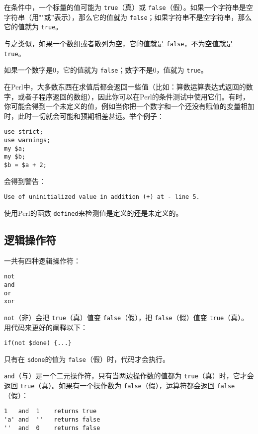 在条件中，一个标量的值可能为 \verb|true|（真）或 \verb|false|（假）。如果一个字符串是空字符串（用""或''表示），那么它的值就为 \verb|false|；如果字符串不是空字符串，那么它的值就为 \verb|true|。

与之类似，如果一个数组或者散列为空，它的值就是 \verb|false|，不为空值就是 \verb|true|。

如果一个数字是0，它的值就为 \verb|false|；数字不是0，值就为 \verb|true|。

在Perl中，大多数东西在求值后都会返回一些值（比如：算数运算表达式返回的数字，或者子程序返回的数组），因此你可以在Perl的条件测试中使用它们。有时，你可能会得到一个未定义的值，例如当你把一个数字和一个还没有赋值的变量相加时，此时一切就会可能和预期相差甚远。举个例子：

\begin{lstlisting}
use strict;
use warnings;
my $a;
my $b;
$b = $a + 2;
\end{lstlisting}

会得到警告：

\begin{lstlisting}
Use of uninitialized value in addition (+) at - line 5.
\end{lstlisting}

使用Perl的函数 \verb|defined|来检测值是定义的还是未定义的。

\subsection{逻辑操作符}
一共有四种逻辑操作符：

\begin{lstlisting}
not
and
or
xor
\end{lstlisting}

 \verb|not|（非）会把 \verb|true|（真）值变 \verb|false|（假），把 \verb|false|（假）值变 \verb|true|（真）。用代码来更好的阐释以下：

\begin{lstlisting}
if(not $done) {...}
\end{lstlisting}

只有在 \verb|$done|的值为 \verb|false|（假）时，代码才会执行。

 \verb|and|（与）是一个二元操作符，只有当两边操作数的值都为 \verb|true|（真）时，它才会返回 \verb|true|（真）。如果有一个操作数为 \verb|false|（假），运算符都会返回 \verb|false|（假）：

\begin{lstlisting}
1   and  1    returns true
'a' and  ''   returns false
''  and  0    returns false
\end{lstlisting}

